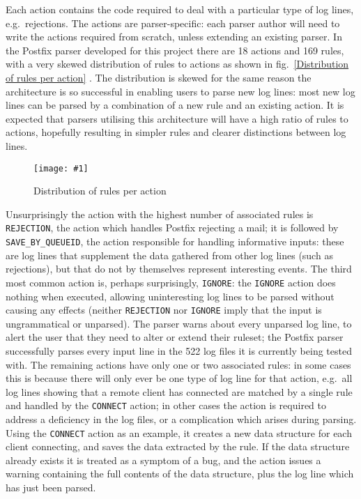 \documentclass[draft]{svmult}
\newcommand{\showgraph}[3]{%
    \begin{figure}[hbtp]%
        \caption{#2}\label{#3}%
        \texttt{[image: \#1]}%
    \end{figure}%
}
\newcommand{\refwithlabel}[2]{%
    #1~\vref{#2}%
}
\newcommand{\graphref}[1]{%
    \refwithlabel{fig.}{#1}%
}
\newcommand{\numberOFrules}[0]{%
    169%
}
\newcommand{\numberOFlogFILESall}[0]{%
    522%
}
\newcommand{\numberOFactions}[0]{%
    18%
}
\begin{document}
Each action contains the code required to deal with a particular type of
log lines, e.g.\ rejections.  The actions are parser-specific: each parser
author will need to write the actions required from scratch, unless
extending an existing parser.  In the Postfix parser developed for this
project there are \numberOFactions{} actions and \numberOFrules{} rules,
with a very skewed distribution of rules to actions as shown in
\graphref{Distribution of rules per action}.  The distribution is skewed
for the same reason the architecture is so successful in enabling users to
parse new log lines: most new log lines can be parsed by a combination of a
new rule and an existing action.  It is expected that parsers utilising
this architecture will have a high ratio of rules to actions, hopefully
resulting in simpler rules and clearer distinctions between log lines.
\showgraph{build/graph-action-distribution}{Distribution of rules per
action}{Distribution of rules per action} Unsurprisingly the action with
the highest number of associated rules is \texttt{REJECTION}, the action
which handles Postfix rejecting a mail; it is followed by
\texttt{SAVE\_BY\_QUEUEID}, the action responsible for handling informative
inputs: these are log lines that supplement the data gathered from other
log lines (such as rejections), but that do not by themselves represent
interesting events.  The third most common action is, perhaps surprisingly,
\texttt{IGNORE}: the \texttt{IGNORE} action does nothing when executed,
allowing uninteresting log lines to be parsed without causing any effects
(neither \texttt{REJECTION} nor \texttt{IGNORE} imply that the input is
ungrammatical or unparsed).  The parser warns about every unparsed log
line, to alert the user that they need to alter or extend their ruleset;
the Postfix parser successfully parses every input line in the
\numberOFlogFILESall{} log files it is currently being tested with.  The
remaining actions have only one or two associated rules: in some cases this
is because there will only ever be one type of log line for that action,
e.g.\ all log lines showing that a remote client has connected are matched
by a single rule and handled by the \texttt{CONNECT} action; in other cases
the action is required to address a deficiency in the log files, or a
complication which arises during parsing.  Using the \texttt{CONNECT}
action as an example, it creates a new data structure for each client
connecting, and saves the data extracted by the rule.  If the data
structure already exists it is treated as a symptom of a bug, and the
action issues a warning containing the full contents of the data structure,
plus the log line which has just been parsed.
\end{document}

